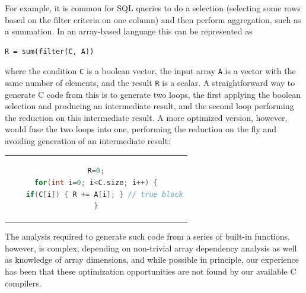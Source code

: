 For example, it is common for SQL queries to do a selection (selecting some
rows based on the filter criteria on one column) and then perform aggregation,
such as a summation.  In an array-based language this can be represented as

\begin{small}
\begin{Verbatim}[xleftmargin=.3\columnwidth]
R = sum(filter(C, A))
\end{Verbatim}
\end{small}


\noindent{}where the condition \texttt{C} is a boolean vector, the input array \texttt{A}
is a vector with the same number of elements, and the result \texttt{R} is a
scalar.  A straightforward way to generate C code from this is to generate two loops, the first applying the boolean selection and producing an intermediate result, and the second loop performing the reduction on this intermediate result.  A more optimized version, however, would fuse the two loops into one, performing the reduction on the fly and avoiding generation of an intermediate result:

\begin{center}
\begin{tabular}{c}
\begin{lstlisting}[language=C, basicstyle=\small]
R=0;
for(int i=0; i<C.size; i++) {
    if(C[i]) { R += A[i]; } // true block
}
\end{lstlisting}
\end{tabular}
\end{center}



\noindent{}The analysis required to generate such code from a series of built-in functions, however, is complex,
depending on non-trivial array dependency analysis as well as knowledge of array dimensions, and 
while possible in principle, our experience has been that these optimization opportunities are not found by our available C compilers.


